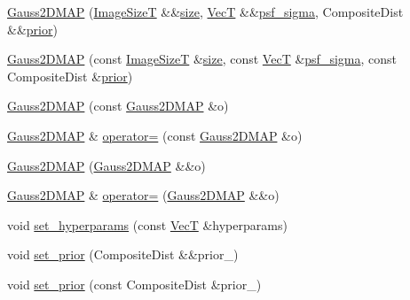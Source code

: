 \begin{DoxyCompactItemize}
\item 
\hyperlink{classmappel_1_1Gauss2DMAP_aec9a838e1def6259651230de5665a8ef}{Gauss2\+D\+M\+AP} (\hyperlink{classmappel_1_1ImageFormat2DBase_a49cccf61eb2a768a202634d27fcd81d5}{Image\+SizeT} \&\&\hyperlink{classmappel_1_1ImageFormat2DBase_a3be77d2aa6ec9f3815322732950c2a60}{size}, \hyperlink{namespacemappel_a2225ad69f358daa3f4f99282a35b9a3a}{VecT} \&\&\hyperlink{classmappel_1_1Gauss2DModel_acb73f86ea080515e843f47be9502b271}{psf\+\_\+sigma}, Composite\+Dist \&\&\hyperlink{classmappel_1_1PointEmitterModel_a393839f8eb1dd3d61c9369377742ba0e}{prior})
\item 
\hyperlink{classmappel_1_1Gauss2DMAP_a86a00b36c16cac408ea9abc3115ad8bf}{Gauss2\+D\+M\+AP} (const \hyperlink{classmappel_1_1ImageFormat2DBase_a49cccf61eb2a768a202634d27fcd81d5}{Image\+SizeT} \&\hyperlink{classmappel_1_1ImageFormat2DBase_a3be77d2aa6ec9f3815322732950c2a60}{size}, const \hyperlink{namespacemappel_a2225ad69f358daa3f4f99282a35b9a3a}{VecT} \&\hyperlink{classmappel_1_1Gauss2DModel_acb73f86ea080515e843f47be9502b271}{psf\+\_\+sigma}, const Composite\+Dist \&\hyperlink{classmappel_1_1PointEmitterModel_a393839f8eb1dd3d61c9369377742ba0e}{prior})
\item 
\hyperlink{classmappel_1_1Gauss2DMAP_a0f6dfe906770e8a4475806c26f4ba1ef}{Gauss2\+D\+M\+AP} (const \hyperlink{classmappel_1_1Gauss2DMAP}{Gauss2\+D\+M\+AP} \&o)
\item 
\hyperlink{classmappel_1_1Gauss2DMAP}{Gauss2\+D\+M\+AP} \& \hyperlink{classmappel_1_1Gauss2DMAP_a45164f58c91c8eefffc0df248a7e8b7e}{operator=} (const \hyperlink{classmappel_1_1Gauss2DMAP}{Gauss2\+D\+M\+AP} \&o)
\item 
\hyperlink{classmappel_1_1Gauss2DMAP_a6af3dbf9969dc4d05428e6824e3be1df}{Gauss2\+D\+M\+AP} (\hyperlink{classmappel_1_1Gauss2DMAP}{Gauss2\+D\+M\+AP} \&\&o)
\item 
\hyperlink{classmappel_1_1Gauss2DMAP}{Gauss2\+D\+M\+AP} \& \hyperlink{classmappel_1_1Gauss2DMAP_ad2e3cada903e15bb83be941daaffcbc8}{operator=} (\hyperlink{classmappel_1_1Gauss2DMAP}{Gauss2\+D\+M\+AP} \&\&o)
\item 
void \hyperlink{classmappel_1_1Gauss2DModel_a7041d1f38f1141773b046489ce6e6b11}{set\+\_\+hyperparams} (const \hyperlink{namespacemappel_a2225ad69f358daa3f4f99282a35b9a3a}{VecT} \&hyperparams)
\item 
void \hyperlink{classmappel_1_1Gauss2DModel_a41a5b18b3f3779562c0dbd19e1b6e29b}{set\+\_\+prior} (Composite\+Dist \&\&prior\+\_\+)
\item 
void \hyperlink{classmappel_1_1Gauss2DModel_a3c9d7cb15022f51ee4138feff10f930c}{set\+\_\+prior} (const Composite\+Dist \&prior\+\_\+)

\end{DoxyCompactItemize}
